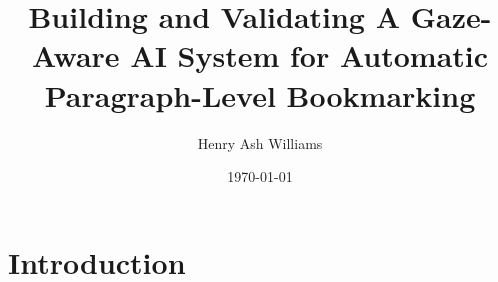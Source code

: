 \documentclass[twocolumn]{report}
\title{Building and Validating A Gaze-Aware AI System for Automatic Paragraph-Level Bookmarking}
\author{Henry Ash Williams}
\date{\today}
\begin{document}
\maketitle
\tableofcontents

\chapter{Introduction}


\end{document}
